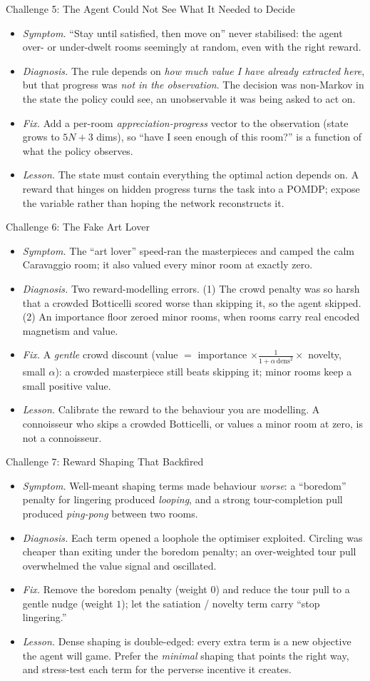 \documentclass[aspectratio=169, 11pt]{beamer}
\newcommand{\good}[1]{\textcolor{safegreen}{#1}}
\newcommand{\bad}[1]{\textcolor{crowdred}{#1}}
\newcommand{\warn}[1]{\textcolor{warnorange}{#1}}
\newcommand{\emp}[1]{\textit{#1}}
\newcommand{\sdfl}[4]{%
\begin{itemize}\setlength\itemsep{2pt}
\item[\bad{\textbf{S}}] \emp{Symptom.} #1
\item[\warn{\textbf{D}}] \emp{Diagnosis.} #2
\item[\good{\textbf{F}}] \emp{Fix.} #3
\item[\textbf{L}] \emp{Lesson.} #4
\end{itemize}}
\begin{document}
\begin{frame}{Challenge 5: The Agent Could Not See What It Needed to Decide}
\footnotesize
\sdfl
{``Stay until satisfied, then move on'' never stabilised: the agent over- or
under-dwelt rooms seemingly at random, even with the right reward.}
{The rule depends on \emp{how much value I have already extracted here}, but that
progress was \emp{not in the observation}. The decision was non-Markov in the state the
policy could see, an unobservable it was being asked to act on.}
{Add a per-room \emp{appreciation-progress} vector to the observation (state grows to
$5N{+}3$ dims), so ``have I seen enough of this room?'' is a function of what the policy
observes.}
{The state must contain everything the optimal action depends on. A reward that hinges
on hidden progress turns the task into a POMDP; expose the variable rather than hoping
the network reconstructs it.}
\end{frame}

\begin{frame}{Challenge 6: The Fake Art Lover}
\footnotesize
\sdfl
{The ``art lover'' speed-ran the masterpieces and camped the calm Caravaggio room; it
also valued every minor room at exactly zero.}
{Two reward-modelling errors. (1) The crowd penalty was so harsh that a crowded
Botticelli scored worse than skipping it, so the agent skipped. (2) An importance floor
zeroed minor rooms, when rooms carry real encoded magnetism and value.}
{A \emp{gentle} crowd discount (value $=$ importance $\times \frac{1}{1+\alpha\,\text{dens}^2}\times$
novelty, small $\alpha$): a crowded masterpiece still beats skipping it; minor rooms
keep a small positive value.}
{Calibrate the reward to the behaviour you are modelling. A connoisseur who skips a
crowded Botticelli, or values a minor room at zero, is not a connoisseur.}
\end{frame}

\begin{frame}{Challenge 7: Reward Shaping That Backfired}
\footnotesize
\sdfl
{Well-meant shaping terms made behaviour \emp{worse}: a ``boredom'' penalty for
lingering produced \emp{looping}, and a strong tour-completion pull produced
\emp{ping-pong} between two rooms.}
{Each term opened a loophole the optimiser exploited. Circling was cheaper than
exiting under the boredom penalty; an over-weighted tour pull overwhelmed the value
signal and oscillated.}
{Remove the boredom penalty (weight $0$) and reduce the tour pull to a gentle nudge
(weight $1$); let the satiation / novelty term carry ``stop lingering.''}
{Dense shaping is double-edged: every extra term is a new objective the agent will
game. Prefer the \emp{minimal} shaping that points the right way, and stress-test each
term for the perverse incentive it creates.}
\end{frame}
\end{document}
